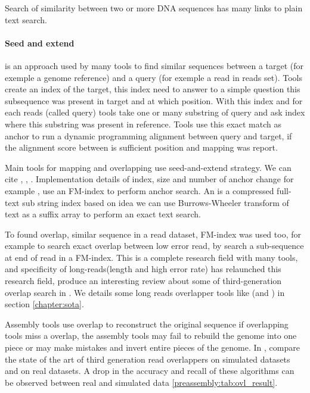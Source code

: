 \documentclass[main.tex]{subfiles}
\begin{document}
Search of similarity between two or more DNA sequences has many links to plain text search.

\paragraph{Seed and extend} is an approach used by many tools to find similar sequences between a target (for exemple a genome reference) and a query (for exemple a read in reads set). Tools create an index of the target, this index need to answer to a simple question this subsequence was present in target and at which position. With this index and for each reads (called query) tools take one or many substring of query and ask index where this substring was present in reference. Tools use this exact match as anchor to run a \citeauthor{smith_waterman}\cite{smith_waterman} dynamic programming alignment between query and target, if the alignment score between is sufficient position and mapping was report.

Main tools for mapping and overlapping use seed-and-extend strategy. We can cite  \cite{blast_one, blast_two},  \cite{bwa_mem},  \cite{blasr}. Implementation details of index, size and number of anchor change for example ,  use an FM-index \cite{fm-index} to perform anchor search. An is a compressed full-text sub string index based on idea we can use Burrows-Wheeler transform of text as a suffix array to perform an exact text search. 

To found overlap, similar sequence in a read dataset, FM-index was used too, for example  \cite{SGA} to search exact overlap between low error read, by search a sub-sequence at end of read in a FM-index. This is a complete research field with many tools, and specificity of long-reads(length and high error rate) has relaunched this research field, \citeauthor{ovl_bench} produce an interesting review about some of third-generation overlap search in \cite{ovl_bench}. We details some long reads overlapper tools like (\mhap and \minimap) in section \ref{chapter:sota}.

Assembly tools use overlap to reconstruct the original sequence if overlapping tools miss a overlap, the assembly tools may fail to rebuild the genome into one piece or may make mistakes and invert entire pieces of the genome. In \cite{ovl_bench}, \citeauthor{ovl_bench} compare the state of the art of third generation read overlappers on simulated datasets and on real datasets. A drop in the accuracy and recall of these algorithms can be observed between real and simulated data \ref{preassembly:tab:ovl_result}.
\end{document}
